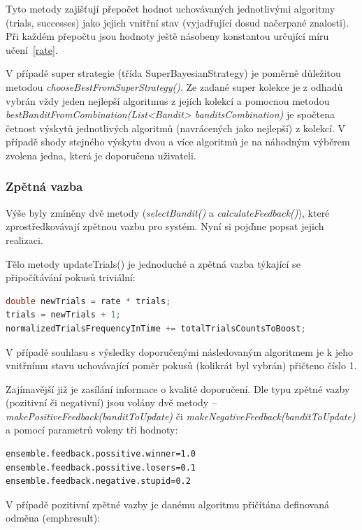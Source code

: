 \documentclass[thesis=M,czech]{FITthesis}[2014/05/07]
\begin{document}
Tyto metody zajišťují přepočet hodnot uchovávaných jednotlivými algoritmy (trials, successes) jako jejich vnitřní stav (vyjadřující dosud načerpané znalosti). Při každém přepočtu jsou hodnoty ještě násobeny konstantou určující míru učení~\ref{rate}.
    
V případě super strategie (třída SuperBayesianStrategy) je poměrně důležitou metodou \emph{chooseBestFromSuperStrategy()}. Ze zadané super kolekce je z odhadů vybrán vždy jeden nejlepší algoritmus z jejích kolekcí a pomocnou metodou \emph{bestBanditFromCombination(List<Bandit> banditsCombination)} je spočtena četnost výskytů jednotlivých algoritmů (navrácených jako nejlepší) z kolekcí. V případě shody stejného výskytu dvou a více algoritmů je na náhodným výběrem zvolena jedna, která je doporučena uživateli.
    
\subsubsection{Zpětná vazba}
\label{implfeedback}     
Výše byly zmíněny dvě metody (\emph{selectBandit()} a \emph{calculateFeedback()}), které zprostředkovávají zpětnou vazbu pro systém. Nyní si pojďme popsat jejich realizaci.

Tělo metody updateTrials() je jednoduché a zpětná vazba týkající se připočítávání pokusů triviální:

\begin{lstlisting}[language=java]
double newTrials = rate * trials;
trials = newTrials + 1;
normalizedTrialsFrequencyInTime += totalTrialsCountsToBoost;
\end{lstlisting}	

V případě souhlasu s výsledky doporučenými následovaným algoritmem je k jeho vnitřnímu stavu uchovávající poměr pokusů (kolikrát byl vybrán) přičteno číslo 1.

Zajímavější již je zasílání informace o kvalitě doporučení. Dle typu zpětné vazby (pozitivní či negativní) jsou volány dvě metody – \emph{makePositiveFeedback(banditToUpdate)} či \emph{makeNegativeFeedback(banditToUpdate)} a pomocí parametrů voleny tři hodnoty:

\begin{verbatim}
ensemble.feedback.possitive.winner=1.0
ensemble.feedback.possitive.losers=0.1
ensemble.feedback.negative.stupid=0.2
\end{verbatim}

V případě pozitivní zpětné vazby je danému algoritmu přičítána definovaná odměna (emph{result}):
\end{document}
